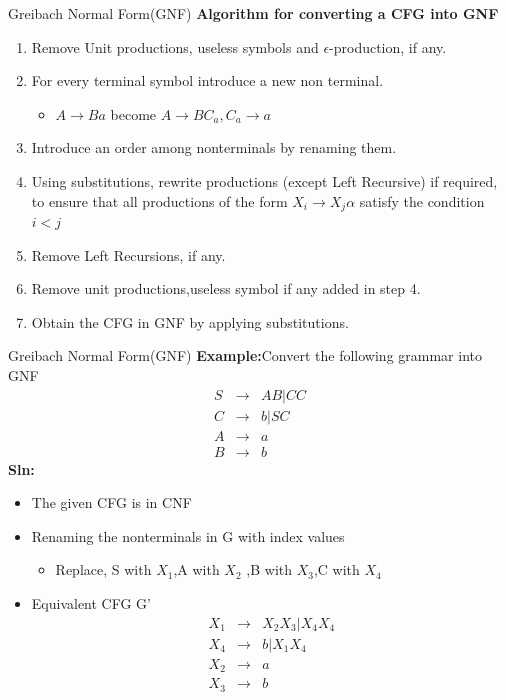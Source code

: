 \documentclass{beamer}
\begin{document}
\begin{frame}{Greibach Normal Form(GNF)}
	\textbf{Algorithm for converting a CFG into GNF}
	\begin{enumerate}
		\item Remove Unit productions, useless symbols and $\epsilon$-production, if any.
		\item  For every terminal symbol  introduce a new non terminal. 
		\begin{itemize}
			\item $A \rightarrow Ba$ become $A \rightarrow BC_a, C_a\rightarrow a$
		\end{itemize}
		\item Introduce an order among nonterminals by renaming them.
		\item Using substitutions, rewrite productions (except Left Recursive) if required, to ensure that all productions of the form $X_i\rightarrow X_j\alpha$ satisfy the condition $i<j$
		\item Remove Left Recursions, if any.
		\item Remove unit productions,useless symbol if any added in step 4.
		\item Obtain the CFG in GNF by applying substitutions.
	\end{enumerate}
\end{frame}
\begin{frame}{Greibach Normal Form(GNF)}
	\textbf{Example:}Convert the following grammar into GNF
	\begin{eqnarray*}
		S&\rightarrow& AB|CC \\
		C&\rightarrow& b|SC \\
		A&\rightarrow&  a\\
		B&\rightarrow& b
	\end{eqnarray*}
	\textbf{Sln:}
	\begin{itemize}
		\item The given CFG is in CNF
		\item Renaming the nonterminals in G with index values
		\begin{itemize}
			\item Replace, S with $X_1$,A with $X_2$ ,B with $X_3$,C with $X_4$
		\end{itemize}
	\item Equivalent CFG G'
	\begin{eqnarray*}
		X_1&\rightarrow& X_2X_3|X_4X_4 \\
		X_4&\rightarrow& b|X_1X_4 \\
		X_2&\rightarrow&  a\\
		X_3&\rightarrow& b\\
	\end{eqnarray*}
	\end{itemize}
\end{frame}
\end{document}
